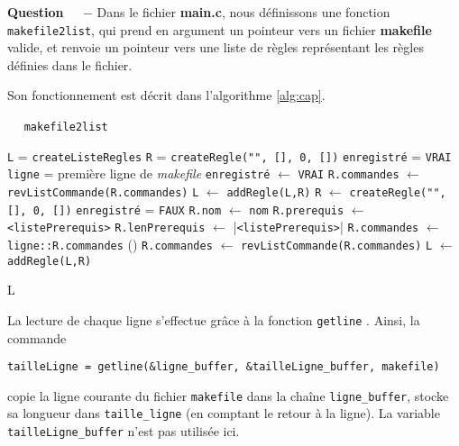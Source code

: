 \documentclass[11pt]{article}
\newcounter{question}[section]
\newenvironment{question}[1][]{\refstepcounter{question}\par\medskip
   \noindent\textbf{Question~\thequestion ~ $-$} \rmfamily}{}
\begin{document}
\begin{question} %
Dans le fichier \textbf{main.c}, nous définissons une fonction \texttt{makefile2list}, qui prend en argument un pointeur vers un fichier \textbf{makefile} valide, et renvoie un pointeur vers une liste de règles représentant les règles définies dans le fichier.

Son fonctionnement est décrit dans l'algorithme \ref{alg:cap}.

\begin{algorithm}[!h]
\caption{ $\quad$ \texttt{makefile2list}}
\label{alg:cap}
\begin{algorithmic}
\State \texttt{L} = \texttt{createListeRegles}
\State \texttt{R} = \texttt{createRegle("", [], 0, [])}
\State \texttt{enregistré} = \texttt{VRAI}
\State \texttt{ligne} = première ligne de \emph{makefile}
	\State \texttt{enregistré} $\gets$ \texttt{VRAI}
	\State \texttt{R.commandes} $\gets$ \texttt{revListCommande(R.commandes)}
	\State \texttt{L} $\gets$ \texttt{addRegle(L,R)}
	\State \texttt{R} $\gets$ \texttt{createRegle("", [], 0, [])}
	\State \texttt{enregistré} = \texttt{FAUX}
	\State \texttt{R.nom} $\gets$ \texttt{nom}
	\State \texttt{R.prerequis} $\gets$ \texttt{<listePrerequis>}
	\State \texttt{R.lenPrerequis} $\gets$ |\texttt{<listePrerequis>}|
	\State \texttt{R.commandes} $\gets$ \texttt{ligne::R.commandes}
\Else {}
    \State ()
\EndIf
\EndWhile
{}
	\State \texttt{R.commandes} $\gets$ \texttt{revListCommande(R.commandes)}
	\State \texttt{L} $\gets$ \texttt{addRegle(L,R)}
\EndIf

\Return L
\end{algorithmic}
\end{algorithm}




La lecture de chaque ligne s'effectue grâce à la fonction \texttt{getline} \cite{getline}. Ainsi, la commande \begin{center}
\texttt{tailleLigne = getline(\&ligne\_buffer, \&tailleLigne\_buffer, makefile)}
\end{center}
copie la ligne courante du fichier \texttt{makefile} dans la chaîne \texttt{ligne\_buffer}, stocke sa longueur dans \texttt{taille\_ligne} (en comptant le retour à la ligne). La variable \texttt{tailleLigne\_buffer} n'est pas utilisée ici.



\end{question}
\end{document}
